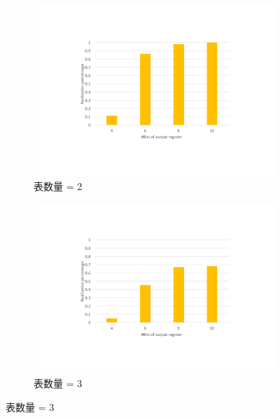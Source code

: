 \begin{figure}  %
  \centering
  \begin{subfigure}[b]{0.46\textwidth}
      \includegraphics[width=\textwidth]{figures/figure-eval-rp-2.pdf}
      \caption{表数量 = 2}
      \label{cap:fig:eval-rp:a}
  \end{subfigure}
  \begin{subfigure}[b]{0.46\textwidth}
      \includegraphics[width=\textwidth]{figures/figure-eval-rp-3.pdf}
      \caption{表数量 = 3}
      \label{cap:fig:eval-rp:b}
  \end{subfigure}


\end{figure}
